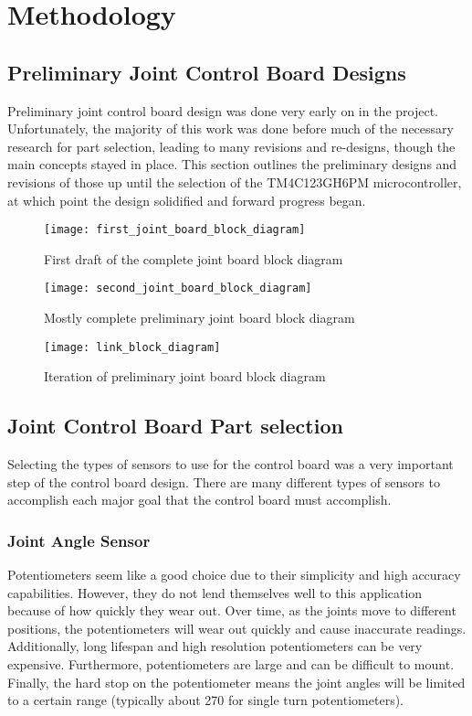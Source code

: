 \section{Methodology}
\subsection{Preliminary Joint Control Board Designs}
Preliminary joint control board design was done very early on in the project. Unfortunately, the majority of this work was done before much of the necessary research for part selection, leading to many revisions and re-designs, though the main concepts stayed in place. This section outlines the preliminary designs and revisions of those up until the selection of the TM4C123GH6PM microcontroller, at which point the design solidified and forward progress began.
\begin{figure}[H]
	\centering
	\texttt{[image: first\_joint\_board\_block\_diagram]}
	\caption{First draft of the complete joint board block diagram}
	\label{fig:1st_joint_board_block}
\end{figure}

\begin{figure}[H]
	\centering
	\texttt{[image: second\_joint\_board\_block\_diagram]}
	\caption{Mostly complete preliminary joint board block diagram}
	\label{fig:2nd_joint_board_block}
\end{figure}

\begin{figure}[H]
	\centering
	\texttt{[image: link\_block\_diagram]}
	\caption{Iteration of preliminary joint board block diagram}
	\label{fig:nice_prelim_joint_board_block}
\end{figure}

\subsection{Joint Control Board Part selection}
Selecting the types of sensors to use for the control board was a very important step of the control board design. There are many different types of sensors to accomplish each major goal that the control board must accomplish.

\subsubsection{Joint Angle Sensor}
Potentiometers seem like a good choice due to their simplicity and high accuracy capabilities. However, they do not lend themselves well to this application because of how quickly they wear out. Over time, as the joints move to different positions, the potentiometers will wear out quickly and cause inaccurate readings. Additionally, long lifespan and high resolution potentiometers can be very expensive. Furthermore, potentiometers are large and can be difficult to mount. Finally, the hard stop on the potentiometer means the joint angles will be limited to a certain range (typically about 270 \textdegree for single turn potentiometers).

